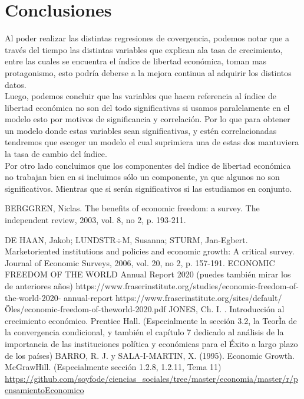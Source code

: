     \section*{Conclusiones}

    Al poder realizar las distintas regresiones de covergencia, podemos notar que a través del tiempo las distintas variables que explican ala tasa de crecimiento, entre las cuales se encuentra el índice de libertad económica, toman mas protagonismo, esto podría deberse a la mejora continua al adquirir los distintos datos.\\
    
    Luego, podemos concluir que las variables que hacen referencia al índice de libertad económica no son del todo significativas si usamos paralelamente en el modelo esto por motivos de significancia y correlación. Por lo que para obtener un modelo donde estas variables sean significativas, y estén correlacionadas tendremos que escoger un modelo el cual suprimiera una de estas dos mantuviera la tasa de cambio del índice.\\

    Por otro lado concluimos  que los componentes del índice de libertad económica no trabajan bien en si incluimos sólo un componente, ya que algunos no son significativos. Mientras que si serán significativos si las estudiamos en conjunto.\\


\let\cleardoublepage\clearpage

\begin{thebibliography}{10}

    \bibitem[1]{}BERGGREN, Niclas. The benefits of economic freedom: a survey. The independent review, 2003, vol. 8, no 2, p. 193-211.

    \bibitem[2]{}DE HAAN, Jakob; LUNDSTR÷M, Susanna; STURM, Jan-Egbert. Marketoriented institutions and policies and economic growth: A critical survey. Journal of Economic Surveys, 2006, vol. 20, no 2, p. 157-191.
    \bibitem[3]{}ECONOMIC FREEDOM OF THE WORLD Annual Report 2020 (puedes también mirar los de anteriores años) https://www.fraserinstitute.org/studies/economic-freedom-of-the-world-2020-
annual-report https://www.fraserinstitute.org/sites/default/Öles/economic-freedom-of-theworld-2020.pdf
    \bibitem[4]{}JONES, Ch. I. . Introducción al crecimiento económico. Prentice Hall. (Especialmente la sección 3.2, la TeorÌa de la convergencia condicional, y también el capítulo 7 dedicado al análisis de la importancia de las instituciones política y económicas para el Éxito a largo plazo de los países)
    \bibitem[5]{}BARRO, R. J. y SALA-I-MARTIN, X. (1995). Economic Growth. McGrawHill. (Especialmente sección 1.2.8, 1.2.11, Tema 11)
\bibitem[6]{}\url{https://github.com/soyfode/ciencias_sociales/tree/master/economia/master/r/pensamientoEconomico}

\end{thebibliography}


